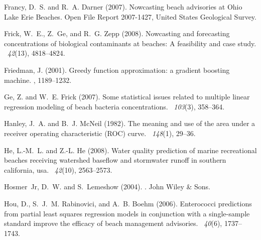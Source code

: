 \documentclass[authoryear,review, 12pt]{elsarticle}
\begin{document}
\begin{thebibliography}{}
Francy, D.~S. and R.~A. Darner (2007).
\newblock Nowcasting beach advisories at {Ohio Lake Erie Beaches}.
\newblock Open File Report 2007-1427, United States Geological Survey.

Frick, W.~E., Z.~Ge, and R.~G. Zepp (2008).
\newblock Nowcasting and forecasting concentrations of biological contaminants
  at beaches: A feasibility and case study.
~{\em 42\/}(13),
  4818--4824.

Friedman, J. (2001).
\newblock Greedy function approximation: a gradient boosting machine.
, 1189--1232.

Ge, Z. and W.~E. Frick (2007).
\newblock Some statistical issues related to multiple linear regression
  modeling of beach bacteria concentrations.
~{\em 103\/}(3), 358--364.

Hanley, J.~A. and B.~J. McNeil (1982).
\newblock The meaning and use of the area under a receiver operating
  characteristic ({ROC}) curve.
~{\em 148\/}(1), 29--36.

He, L.-M.~L. and Z.-L. He (2008).
\newblock Water quality prediction of marine recreational beaches receiving
  watershed baseflow and stormwater runoff in southern california, usa.
~{\em 42\/}(10), 2563--2573.

Hosmer~Jr, D.~W. and S.~Lemeshow (2004).
.
\newblock John Wiley \& Sons.

Hou, D., S.~J.~M. Rabinovici, and A.~B. Boehm (2006).
\newblock Enterococci predictions from partial least squares regression models
  in conjunction with a single-sample standard improve the efficacy of beach
  management advisories.
~{\em 40\/}(6),
  1737--1743.


\end{thebibliography}
\end{document}
